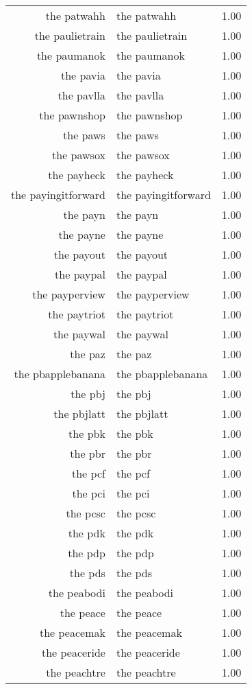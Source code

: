 \begin{table}[ht]
\begin{tabular}{rlr}
  the patwahh & the patwahh & 1.00 \\ 
  the paulietrain & the paulietrain & 1.00 \\ 
  the paumanok & the paumanok & 1.00 \\ 
  the pavia & the pavia & 1.00 \\ 
  the pavlla & the pavlla & 1.00 \\ 
  the pawnshop & the pawnshop & 1.00 \\ 
  the paws & the paws & 1.00 \\ 
  the pawsox & the pawsox & 1.00 \\ 
  the payheck & the payheck & 1.00 \\ 
  the payingitforward & the payingitforward & 1.00 \\ 
  the payn & the payn & 1.00 \\ 
  the payne & the payne & 1.00 \\ 
  the payout & the payout & 1.00 \\ 
  the paypal & the paypal & 1.00 \\ 
  the payperview & the payperview & 1.00 \\ 
  the paytriot & the paytriot & 1.00 \\ 
  the paywal & the paywal & 1.00 \\ 
  the paz & the paz & 1.00 \\ 
  the pbapplebanana & the pbapplebanana & 1.00 \\ 
  the pbj & the pbj & 1.00 \\ 
  the pbjlatt & the pbjlatt & 1.00 \\ 
  the pbk & the pbk & 1.00 \\ 
  the pbr & the pbr & 1.00 \\ 
  the pcf & the pcf & 1.00 \\ 
  the pci & the pci & 1.00 \\ 
  the pcsc & the pcsc & 1.00 \\ 
  the pdk & the pdk & 1.00 \\ 
  the pdp & the pdp & 1.00 \\ 
  the pds & the pds & 1.00 \\ 
  the peabodi & the peabodi & 1.00 \\ 
  the peace & the peace & 1.00 \\ 
  the peacemak & the peacemak & 1.00 \\ 
  the peaceride & the peaceride & 1.00 \\ 
  the peachtre & the peachtre & 1.00 \\ 

\end{tabular}
\end{table}
